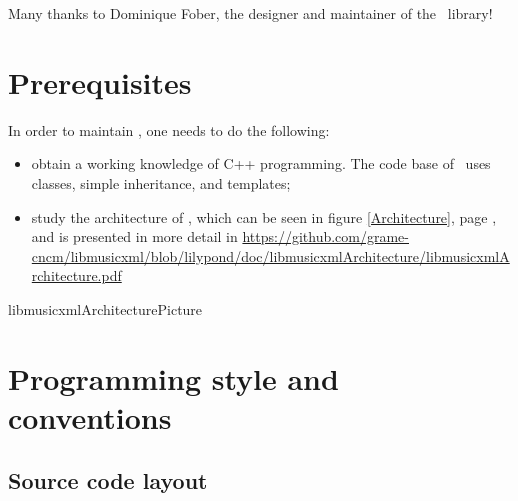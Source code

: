 \documentclass[12pt,a4paper]{article}
\begin{document}
Many thanks to Dominique Fober, the designer and maintainer of the \lib\ library!


\section{Prerequisites}

In order to maintain \lib, one needs to do the following:
\begin{itemize}
\item obtain a working knowledge of C++ programming. The code base of \lib\ uses classes, simple inheritance, and templates;


\item study the architecture of \lib, which can be seen in figure \ref {Architecture}, page \pageref {Architecture}, and is presented in more detail in \url{https://github.com/grame-cncm/libmusicxml/blob/lilypond/doc/libmusicxmlArchitecture/libmusicxmlArchitecture.pdf}
\end{itemize}

{libmusicxmlArchitecturePicture}


\section{Programming style and conventions}

\subsection{Source code layout}
\end{document}
